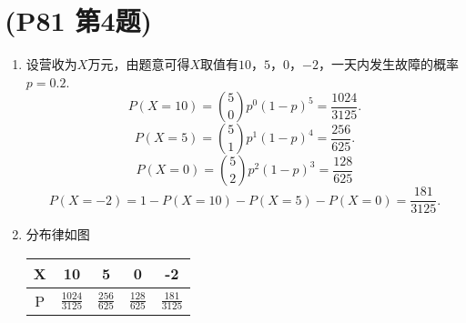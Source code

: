 \documentclass{article}
\begin{document}
\section{(P81 第4题)}  %
\begin{enumerate}
    \item []设营收为$X$万元，由题意可得$X$取值有$10$，$5$，$0$，$-2$，一天内发生故障的概率$p=0.2$.
    \[
        P(X=10)
        =\binom{5}{0} {p}^{0} {(1-p)}^{5} 
        =\frac{1024}{3125}.
    \]    
    \[
        P(X=5)
        =\binom{5}{1} {p}^{1} {(1-p)}^{4} 
        =\frac{256}{625}.   
    \]
    \[
        P(X=0)
        =\binom{5}{2} {p}^{2} {(1-p)}^{3} 
        =\frac{128}{625}   
    \]
    \[
        P(X=-2)
        =1-P(X=10)-P(X=5)-P(X=0)  
        =\frac{181}{3125}.  
    \]    
    \item []分布律如图
    \begin{table}[!ht]
        \centering
        \begin{tabular}{c|cccc}
            X & 10 & 5 & 0 & -2 \\ \hline
            P & $\displaystyle{\frac{1024}{3125}}$ & $\displaystyle{\frac{256}{625}}$ & $\displaystyle{\frac{128}{625}}$ & $\displaystyle{\frac{181}{3125}}$ 
        \end{tabular}
    \end{table}
\end{enumerate}
\end{document}
